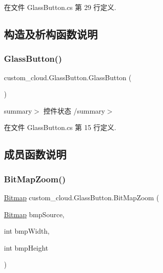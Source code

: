 在文件 Glass\+Button.\+cs 第 29 行定义.



\subsection{构造及析构函数说明}
\mbox{\label{classcustom__cloud_1_1_glass_button_afc0a6caa165816390dd4950e8a71621e}} 
\subsubsection{\texorpdfstring{Glass\+Button()}{GlassButton()}}
{\footnotesize\ttfamily custom\+\_\+cloud.\+Glass\+Button.\+Glass\+Button (\begin{DoxyParamCaption}{ }\end{DoxyParamCaption})}

summary$>$ 控件状态 /summary$>$ 

在文件 Glass\+Button.\+cs 第 15 行定义.



\subsection{成员函数说明}
\mbox{\label{classcustom__cloud_1_1_glass_button_a02da6ff048ffb4c08ad80dd26b633615}} 
\subsubsection{\texorpdfstring{Bit\+Map\+Zoom()}{BitMapZoom()}}
{\footnotesize\ttfamily \hyperlink{classcustom__cloud_1_1_glass_button_a8c1e11783aa485f2b32c29e276a0a19b}{Bitmap} custom\+\_\+cloud.\+Glass\+Button.\+Bit\+Map\+Zoom (\begin{DoxyParamCaption}\item[{\hyperlink{classcustom__cloud_1_1_glass_button_a8c1e11783aa485f2b32c29e276a0a19b}{Bitmap}}]{bmp\+Source,  }\item[{int}]{bmp\+Width,  }\item[{int}]{bmp\+Height }\end{DoxyParamCaption})}



